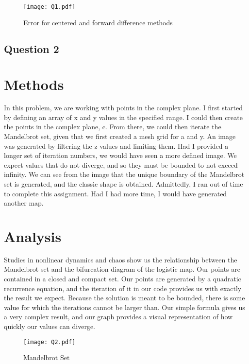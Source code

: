 \documentclass{article}
\begin{document}
\begin{figure}[htp]
    \centering
    \texttt{[image: Q1.pdf]}
    \caption{Error for centered and forward difference methods}
    \label{fig:Q1}
\end{figure}

\newpage

\begin{center}
    \section*{Question 2}
\end{center}

\section*{Methods}

In this problem, we are working with points in the complex plane. I first started by defining an array of x and y values in the specified range. I could then create the points in the complex plane, c. From there, we could then iterate the Mandelbrot set, given that we first created a mesh grid for a and y. An image was generated by filtering the z values and limiting them. Had I provided a longer set of iteration numbers, we would have seen a more defined image. We expect values that do not diverge, and so they must be bounded to not exceed infinity. We can see from the image that the unique boundary of the Mandelbrot set is generated, and the classic shape is obtained. Admittedly, I ran out of time to complete this assignment. Had I had more time, I would have generated another map.

\section*{Analysis}

Studies in nonlinear dynamics and chaos show us the relationship between the Mandelbrot set and the bifurcation diagram of the logistic map. Our points are contained in a closed and compact set. Our points are generated by a quadratic recurrence equation, and the iteration of it in our code provides us with exactly the result we expect. Because the solution is meant to be bounded, there is some value for which the iterations cannot be larger than. Our simple formula gives us a very complex result, and our graph provides a visual representation of how quickly our values can diverge.

\begin{figure}[htp]
    \centering
    \texttt{[image: Q2.pdf]}
    \caption{Mandelbrot Set}
    \label{fig:Q2}
\end{figure}
\end{document}
